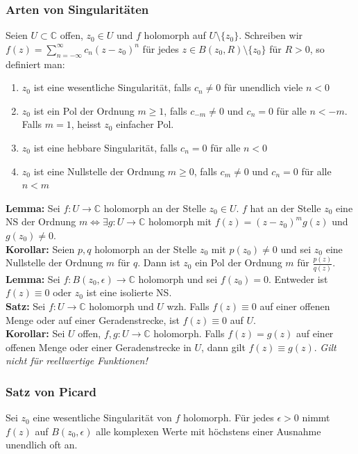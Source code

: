 \documentclass[8pt, a4paper, landscape, fleqn]{scrartcl}
\def\C{\mathbb{C}}
\newcommand{\blue}[1]{\textcolor{ethblue}{#1}}
\begin{document}
\begin{multicols*}{3}
	    \subsubsection{Arten von Singularitäten}
	    Seien $U \subset \C$ offen, $z_0 \in U$ und $f$ holomorph auf $U \setminus \{z_0\}$. Schreiben wir $f(z) = \sum_{n=-\infty}^\infty c_n(z-z_0)^n$ für jedes $z \in B(z_0, R)\setminus\{z_0\}$ für $R>0$, so definiert man: 
	    \begin{enumerate}
	        \item $z_0$ ist eine \blue{wesentliche Singularität}, falls $c_n \neq 0$ für unendlich viele $n<0$
	        \item $z_0$ ist ein \blue{Pol der Ordnung $m\geq 1$}, falls $c_{-m} \neq 0$ und $c_n = 0$ für alle $n< -m$. Falls $m=1$, heisst $z_0$ einfacher Pol.
	        \item $z_0$ ist eine \blue{hebbare Singularität}, falls $c_n = 0$ für alle $n < 0$
	        \item $z_0$ ist eine \blue{Nullstelle der Ordnung $m\geq 0$}, falls $c_m\neq 0$ und $c_n = 0$ für alle $n<m$  
	    \end{enumerate}
	    
	    \textbf{Lemma: } Sei $f : U \to \C$ holomorph an der Stelle $z_0\in U$. $f$ hat an der Stelle $z_0$ eine NS der Ordnung $m \Leftrightarrow \exists g: U\to \C$ holomorph mit $f(z) = (z-z_0)^mg(z)$ und $g(z_0) \neq 0$. \\
	    \textbf{Korollar: } Seien $p, q$ holomorph an der Stelle $z_0$ mit $p(z_0) \neq 0$ und sei $z_0$ eine Nullstelle der Ordnung $m$ für $q$. Dann ist $z_0$ ein Pol der Ordnung $m$ für $\frac{p(z)}{q(z)}$.\\
	    \textbf{Lemma: } Sei $f:B(z_0, \epsilon) \to \C$ holomorph und sei $f(z_0) = 0$. Entweder ist $f(z) \equiv 0$ oder $z_0$ ist eine isolierte NS.\\
	    \textbf{Satz: } Sei $f: U\to\C$ holomorph und $U$ wzh. Falls $f(z) \equiv 0$ auf einer offenen Menge oder auf einer Geradenstrecke, ist $f(z) \equiv 0$ auf $U$.\\
	    \textbf{Korollar: } Sei $U$ offen, $f, g: U\to\C$ holomorph. Falls $f(z) = g(z)$ auf einer offenen Menge oder einer Geradenstrecke in $U$, dann gilt $f(z) \equiv g(z)$. \textit{Gilt nicht für reellwertige Funktionen!}
	    
	    
	    
	    \subsubsection{Satz von Picard}
	    Sei $z_0$ eine wesentliche Singularität von $f$ holomorph. Für jedes $\epsilon > 0$ nimmt $f(z)$ auf $B(z_0, \epsilon)$ alle komplexen Werte mit höchstens einer Ausnahme unendlich oft an. 
	

\end{multicols*}
\end{document}
